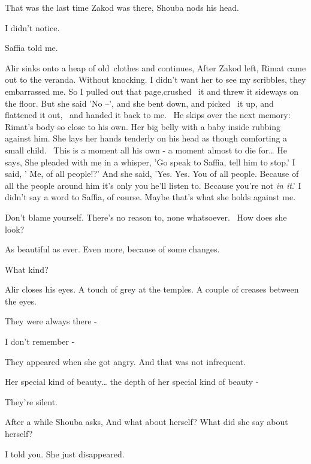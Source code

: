 \documentclass[letterpaper]{article}
\begin{document}
{\textquotedbl}That was the last time Zakod was there,{\textquotedbl} Shouba nods his head.

{\textquotedbl}I didn't notice.{\textquotedbl} 

{\textquotedbl}Saffia told me.{\textquotedbl}

Alir sinks onto a heap of old~clothes and continues, {\textquotedbl}After Zakod left, Rimat came out to the veranda.
Without knocking. I didn't want her to see my scribbles, they embarrassed me. So I pulled out that page,crushed \ it
and threw it sideways on the floor. But she said 'No --', and she bent down, and picked \ it up, and flattened it out,
\ and handed it back to me.{\textquotedbl}~ He skips over the next memory: Rimat's body so close to his own. Her big
belly with a baby inside rubbing against him. She lays her hands tenderly on his head as though comforting a small
child. \ This is a moment all his own - a moment almost to die for{\dots} He says, {\textquotedbl}She pleaded with me
in a whisper, 'Go speak to Saffia, tell him to stop.' I said, ' Me, of all people!?' And she said, 'Yes. Yes. You of
all people. Because of all the people around him it's only you he'll listen to. Because you're not \textit{in it}.' I
didn't say a word to Saffia, of course. Maybe that's what she holds against me.{\textquotedbl} 

{\textquotedbl}Don't blame yourself. There's no reason to, none whatsoever.~ How does she look?{\textquotedbl} 

{\textquotedbl}As beautiful as ever. Even more, because of some changes.{\textquotedbl} 

{\textquotedbl}What kind?{\textquotedbl} 

Alir closes his eyes. {\textquotedbl}A touch of grey at the temples. A couple of creases between the
eyes.{\textquotedbl} 

{\textquotedbl}They were always there -{\textquotedbl}~ 

{\textquotedbl}I don't remember -{\textquotedbl} 

{\textquotedbl}They appeared when she got angry. And that was not infrequent.{\textquotedbl} 

{\textquotedbl}Her special kind of beauty{\dots} the depth of her special kind of beauty -{\textquotedbl} 

They're silent.

After a while Shouba asks, {\textquotedbl}And what about herself? What did she say about herself?{\textquotedbl} 

{\textquotedbl}I told you. She just disappeared.{\textquotedbl} 
\end{document}
